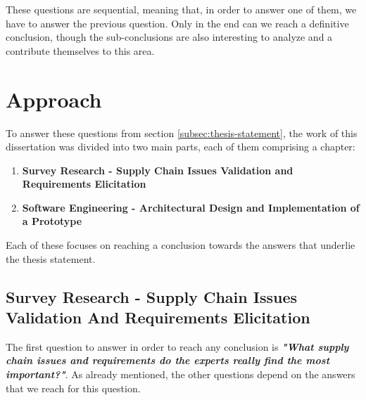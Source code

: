 These questions are sequential, meaning that, in order to answer one of them, we have to answer the previous question. Only in the end can we reach a definitive conclusion, though the sub-conclusions are also interesting to analyze and a contribute themselves to this area.


\section{Approach}


To answer these questions from section \ref{subsec:thesis-statement}, the work of this dissertation was divided into two main parts, each of them comprising a chapter:
\begin{enumerate}
\item \textbf{Survey Research - Supply Chain Issues Validation and Requirements Elicitation}
\item \textbf{Software Engineering - Architectural Design and Implementation of a Prototype}
\end{enumerate}


Each of these focuses on reaching a conclusion towards the answers that underlie the thesis statement.

\subsection{Survey Research - Supply Chain Issues Validation And Requirements Elicitation}
\label{sec:survey-approach}
The first question to answer in order to reach any conclusion is \textbf{\textit{"What supply chain issues and requirements do the experts really find the most important?"}}. As already mentioned, the other questions depend on the answers that we reach for this question.

